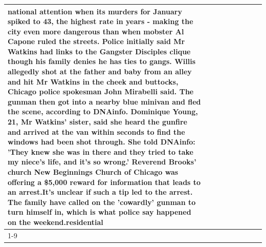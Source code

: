 \begin{table}[H]
\begin{tabular}{lllrlllll}
national attention when its murders for January spiked to 43, the highest rate in years - making the city even more dangerous than when mobster Al Capone ruled the streets. Police initially said Mr Watkins had links to the Gangster Disciples clique though his family denies he has ties to gangs. Willis allegedly shot at the father and baby from an alley and hit Mr Watkins in the cheek and buttocks, Chicago police spokesman John Mirabelli said. The gunman then got into a nearby blue minivan and fled the scene, according to DNAinfo. Dominique Young, 21, Mr Watkins' sister, said she heard the gunfire and arrived at the van within seconds to find the windows had been shot through. She told DNAinfo: 'They knew she was in there and they tried to take my niece's life, and it's so wrong.' Reverend Brooks' church New Beginnings Church of Chicago was offering a \$5,000 reward for information that leads to an arrest.It's unclear if such a tip led to the arrest. The family have called on the 'cowardly' gunman to turn himself in, which is what police say happened on the weekend.residential \\
\cline{1-9}

\end{tabular}
\end{table}
